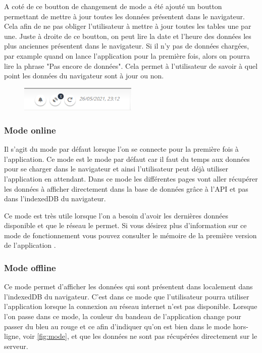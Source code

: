 \documentclass{EPL-master-thesis-covers-FR}
\begin{document}
				 A coté de ce boutton de changement de mode a été ajouté un boutton permettant de mettre à jour toutes les données présentent dans le navigateur. Cela afin de ne pas obliger l'utilisateur à mettre à jour toutes les tables une par une. Juste à droite de ce boutton, on peut lire la date et l'heure des données les plus anciennes présentent dans le navigateur. Si il n'y pas de données chargées, par example quand on lance l'application pour la première fois, alors on pourra lire la phrase "Pas encore de données". Cela permet à l'utilisateur de savoir à quel point les données du navigateur sont à jour ou non.
				
				\begin{figure}[H]
					\centering
					\includegraphics[width=0.5\textwidth]{images/buttons}
					\label{fig:buttons}
				\end{figure}
			
			\subsubsection*{Mode online}
				Il s'agit du mode par défaut lorsque l'on se connecte pour la première fois à l'application. Ce mode est le mode par défaut car il faut du temps aux données pour se charger dans le navigateur et ainsi l'utilisateur peut déjà utiliser l'application en attendant. Dans ce mode les différentes pages vont aller récupérer les données à afficher directement dans la base de données grâce à l'API et pas dans l'indexedDB du navigateur. 
				
				Ce mode est très utile lorsque l'on a besoin d'avoir les dernières données disponible et que le réseau le permet. Si vous désirez plus d'information sur ce mode de fonctionnement vous pouvez consulter le mémoire de la première version de l'application \cite{ref:haitiwater}.
			
			\subsubsection*{Mode offline}
			
				Ce mode permet d'afficher les données qui sont présentent dans localement dans l'indexedDB du navigateur. C'est dans ce mode que l'utilisateur pourra utiliser l'application lorsque la connexion au réseau internet n'est pas disponible. Lorsque l'on passe dans ce mode, la couleur du bandeau de l'application change pour passer du bleu au rouge et ce afin d'indiquer qu'on est bien dans le mode hors-ligne, voir \ref{fig:mode}, et que les données ne sont pas récupérées directement sur le serveur.
								
\end{document}
